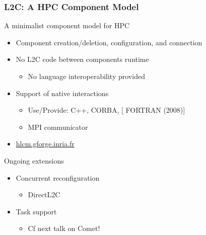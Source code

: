 \documentclass{beamer}
\begin{document}
\begin{frame}
\frametitle{L2C: A HPC Component Model}
\begin{block}{A minimalist component model for HPC}
  \begin{itemize}
  \item Component creation/deletion, configuration, and connection
  \item No L2C code between components \@ runtime
    \begin{itemize}
      \item No language interoperability provided
    \end{itemize}
  \item  Support of native interactions
    \begin{itemize}
    \item Use/Provide: C++, CORBA, [ FORTRAN (2008)]
    \item MPI communicator
    \end{itemize}
  \item \url{hlcm.gforge.inria.fr}
  \end{itemize}
\end{block}
\begin{alertblock}{Ongoing extensions}
  \begin{itemize}
  \item Concurrent reconfiguration
    \begin{itemize}
    \item DirectL2C
    \end{itemize}
  \item Task support
    \begin{itemize}
    \item {\color{red} Cf next talk on Comet!}
    \end{itemize}
  \end{itemize}
\end{alertblock}
\vspace{-4.2cm}\hspace{6.8cm}
\end{frame}
\end{document}

